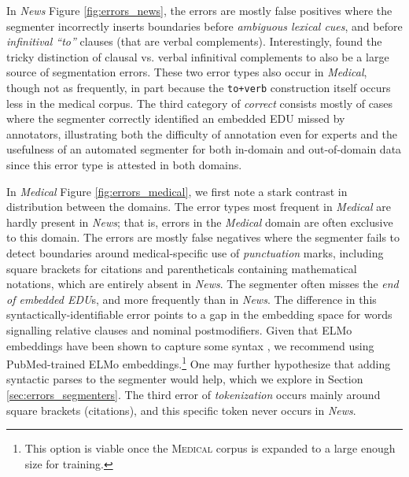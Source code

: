 In \textit{News} Figure \ref{fig:errors_news}, the errors are mostly false positives where the segmenter incorrectly inserts boundaries before \textit{ambiguous lexical cues}, and before \textit{infinitival ``to''} clauses (that are verbal complements).  Interestingly,  found the tricky distinction of clausal vs. verbal infinitival complements to also be a large source of segmentation errors. These two error types also occur in \textit{Medical}, though not as frequently, in part because the \texttt{to+verb} construction itself occurs less in the medical corpus. The third category of \textit{correct} consists mostly of cases where the segmenter correctly identified an embedded EDU missed by annotators, illustrating both the difficulty of annotation even for experts and the usefulness of an automated segmenter for both in-domain and out-of-domain data since this error type is attested in both domains.

In \textit{Medical} Figure \ref{fig:errors_medical}, we first note a stark contrast in distribution between the domains.  The error types most frequent in \textit{Medical} are hardly present in \textit{News}; that is, errors in the \textit{Medical} domain are often exclusive to this domain. The errors are mostly false negatives where the segmenter fails to detect boundaries around medical-specific use of \textit{punctuation} marks, including square brackets for citations and parentheticals containing mathematical notations, which are entirely absent in \textit{News}. The segmenter often misses the \textit{end of embedded EDU}s, and more frequently than in \textit{News}. The difference in this syntactically-identifiable error points to a gap in the embedding space for words signalling relative clauses and nominal postmodifiers. Given that ELMo embeddings have been shown to capture some syntax \cite{Tenney:2019}, we recommend using PubMed-trained ELMo embeddings.\footnote{This option is viable once the \textsc{Medical} corpus is expanded to a large enough size for training.} One may further hypothesize that adding syntactic parses to the segmenter would help, which we explore in Section \ref{sec:errors_segmenters}. The third error of \textit{tokenization} occurs mainly around square brackets (citations), and this specific token never occurs in \textit{News}. 

